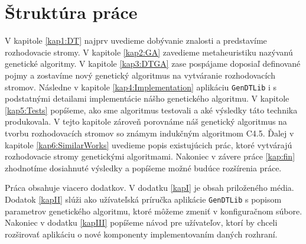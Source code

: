 \section{Štruktúra práce}
V kapitole \ref{kap1:DT} najprv uvedieme dobývanie znalosti a predstavíme rozhodovacie stromy. V kapitole \ref{kap2:GA} zavedieme metaheuristiku nazývanú genetické algoritmy. V kapitole \ref{kap3:DTGA} zase pospájame doposiaľ definované pojmy a zostavíme nový genetický algoritmus na vytváranie rozhodovacích stromov. Následne v kapitole \ref{kap4:Implementation} aplikáciu \verb|GenDTLib| i s podstatnými detailami implementácie nášho genetického algoritmu. V kapitole \ref{kap5:Tests} popíšeme, ako sme algoritmus testovali a aké výsledky táto technika produkovala. V tejto kapitole zároveň porovnáme náš genetický algoritmus na tvorbu rozhodovacích stromov so známym indukčným algoritmom C4.5. Ďalej v kapitole \ref{kap6:SimilarWorks} uvedieme popis existujúcich prác, ktoré vytvárajú rozhodovacie stromy genetickými algoritmami. Nakoniec v závere práce \ref{kap:fin} zhodnotíme dosiahnuté výsledky a popíšeme možné budúce rozšírenia práce.

Práca obsahuje viacero dodatkov. V dodatku \ref{kapI} je obsah priloženého média. Dodatok \ref{kapII} slúži ako užívateľská príručka aplikácie \verb|GenDTLib| s popisom parametrov genetického algoritmu, ktoré môžeme zmeniť v konfiguračnom súbore. Nakoniec v dodatku \ref{kapIII} popíšeme návod pre užívateľov, ktorí by chceli rozširovať aplikáciu o nové komponenty implementovaním daných rozhraní.